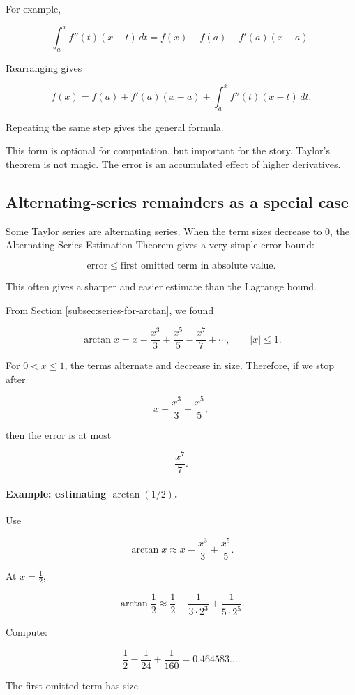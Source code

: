 For example,

\[
\int_a^x f''(t)(x-t)\,dt
=
f(x)-f(a)-f'(a)(x-a).
\]

Rearranging gives

\[
f(x)=f(a)+f'(a)(x-a)+\int_a^x f''(t)(x-t)\,dt.
\]

Repeating the same step gives the general formula.

This form is optional for computation, but important for the story.  Taylor's theorem is
not magic.  The error is an accumulated effect of higher derivatives.

\subsection{Alternating-series remainders as a special case}
\label{subsec:alternating-series-remainders-special-case}

Some Taylor series are alternating series.  When the term sizes decrease to \(0\), the
Alternating Series Estimation Theorem gives a very simple error bound:

\[
\boxed{
\text{error} \le \text{first omitted term in absolute value}.
}
\]

This often gives a sharper and easier estimate than the Lagrange bound.

From Section \ref{subsec:series-for-arctan}, we found

\[
\arctan x
=
x-\frac{x^3}{3}+\frac{x^5}{5}-\frac{x^7}{7}+\cdots,
\qquad |x|\le1.
\]

For \(0<x\le1\), the terms alternate and decrease in size.  Therefore, if we stop after

\[
x-\frac{x^3}{3}+\frac{x^5}{5},
\]

then the error is at most

\[
\frac{x^7}{7}.
\]

\paragraph{Example: estimating \(\arctan(1/2)\).}
Use

\[
\arctan x
\approx
x-\frac{x^3}{3}+\frac{x^5}{5}.
\]

At \(x=\frac12\),

\[
\arctan\frac12
\approx
\frac12-\frac{1}{3\cdot2^3}+\frac{1}{5\cdot2^5}.
\]

Compute:

\[
\frac12-\frac1{24}+\frac1{160}
=
0.464583\ldots.
\]

The first omitted term has size

